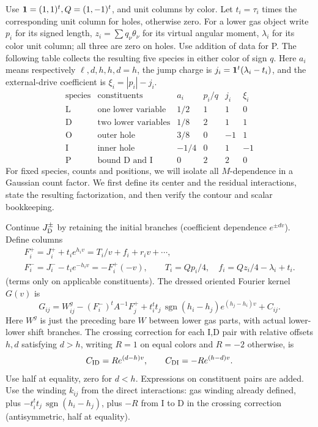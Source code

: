 Use \({\bf 1}=(1,1)^t, Q=(1,-1)^t\), and unit columns by color. Let \(t_i=\tau_i\) times the corresponding unit column for holes, otherwise zero. For a lower gas object write \(p_i\) for its signed length, \(z_i=\sum q_\nu\theta_\nu\) for its virtual angular moment, \(\lambda_i\) for its color unit column; all three are zero on holes. Use addition of data for P. The following table collects the resulting five species in either color of sign \(q\). Here \(a_i\) means respectively \(\ell,d,h,h,d=h\), the jump charge is \(j_i={\bf1}^t(\lambda_i-t_i)\), and the external-drive coefficient is \(\xi_i=|p_i|-j_i\).
\[
\begin{array}{c|l|rrrr}
 \text{species}&\text{constituents}&a_i&p_i/q&j_i&\xi_i\\\hline
 \mathrm L&\text{one lower variable}&1/2&1&1&0\\
 \mathrm D&\text{two lower variables}&1/8&2&1&1\\
 \mathrm O&\text{outer hole}&3/8&0&-1&1\\
 \mathrm I&\text{inner hole}&-1/4&0&1&-1\\
 \mathrm P&\text{bound D and I}&0&2&2&0
\end{array}
\]
For fixed species, counts and positions, we will isolate all \(M\)-dependence in a Gaussian count factor. We first define its center and the residual interactions, state the resulting factorization, and then verify the contour and scalar bookkeeping.

Continue \(J_{\rm D}^\pm\) by retaining the initial branches (coefficient dependence \(e^{\pm d v}\)). Define columns
\[
\begin{gathered}
 F_i^+=J_i^++t_i e^{h_i v}=T_i/v+f_i+r_i v+\cdots,\\
 F_i^-=J_i^- -t_i e^{-h_i v}=-F_i^+(-v),\qquad
 T_i=Qp_i/4,\quad f_i=Qz_i/4-\lambda_i+t_i.
\end{gathered}
\]
(terms only on applicable constituents). The dressed oriented Fourier kernel \(G(v)\) is
\[
 G_{ij}=W^{g}_{ij}-(F_i^-)^t A^{-1}F_j^+
       +t_i^t t_j\,\operatorname{sgn}(h_i-h_j)e^{(h_j-h_i)v}+C_{ij}.
\]
Here \(W^g\) is just the preceding bare \(W\) between lower gas parts, with actual lower-lower shift branches. The crossing correction for each I,D pair with relative offsets \(h,d\) satisfying \(d>h\), writing \(R=1\) on equal colors and \(R=-2\) otherwise, is
\[
 C_{\rm ID}=R e^{(d-h)v},\qquad C_{\rm DI}=-R e^{(h-d)v}.
\]
Use half at equality, zero for \(d<h\). Expressions on constituent pairs are added. Use the winding \(k_{ij}\) from the direct interactions: gas winding already defined, plus \(-t_i^t t_j\,\operatorname{sgn}(h_i-h_j)\), plus \(-R\) from I to D in the crossing correction (antisymmetric, half at equality).

